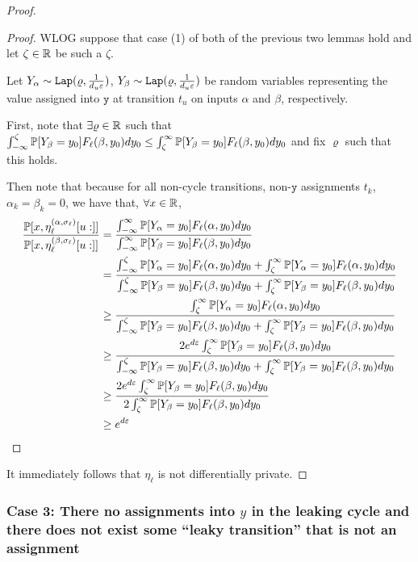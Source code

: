 \begin{proof}
\begin{proof}
	WLOG suppose that case (1) of both of the previous two lemmas hold and let $\zeta\in \mathbb{R}$ be such a $\zeta$. 

	Let $Y_\alpha\sim \texttt{Lap}(\varrho, \frac{1}{d_u\varepsilon})$, $Y_\beta\sim \texttt{Lap}(\varrho, \frac{1}{d_u\varepsilon})$ be random variables representing the value assigned into $\texttt{y}$ at transition $t_u$ on inputs $\alpha$ and $\beta$, respectively. 

	First, note that $\exists \varrho\in \mathbb{R}$ such that $\int_{-\infty}^\zeta\mathbb{P}[Y_\beta=y_0]F_\ell(\beta, y_0)dy_0\leq \int_{\zeta}^\infty\mathbb{P}[Y_\beta=y_0]F_\ell(\beta, y_0)dy_0$ and fix $\varrho$ such that this holds. 

	Then note that because for all non-cycle transitions, non-$\texttt{y}$ assignments $t_k$, $\alpha_k=\beta_k=0$, we have that, $\forall x\in \mathbb{R}$, \begin{align*}
		\frac{\mathbb{P}[x, \eta_\ell^{(\alpha, \sigma_\ell)}[u:]]}{\mathbb{P}[x, \eta_\ell^{(\beta, \sigma_\ell)}[u:]]}&=\frac{\int_{-\infty}^\infty\mathbb{P}[Y_\alpha=y_0]F_\ell(\alpha, y_0)dy_0}{\int_{-\infty}^\infty\mathbb{P}[Y_\beta=y_0]F_\ell(\beta, y_0)dy_0}\\
		&=\frac{\int_{-\infty}^\zeta\mathbb{P}[Y_\alpha=y_0]F_\ell(\alpha, y_0)dy_0+\int_{\zeta}^\infty\mathbb{P}[Y_\alpha=y_0]F_\ell(\alpha, y_0)dy_0}{\int_{-\infty}^\zeta\mathbb{P}[Y_\beta=y_0]F_\ell(\beta, y_0)dy_0+\int_{\zeta}^\infty\mathbb{P}[Y_\beta=y_0]F_\ell(\beta, y_0)dy_0}\\
		&\geq \frac{\int_{\zeta}^\infty\mathbb{P}[Y_\alpha=y_0]F_\ell(\alpha, y_0)dy_0}{\int_{-\infty}^\zeta\mathbb{P}[Y_\beta=y_0]F_\ell(\beta, y_0)dy_0+\int_{\zeta}^\infty\mathbb{P}[Y_\beta=y_0]F_\ell(\beta, y_0)dy_0}\\
		&\geq \frac{2e^{d\varepsilon}\int_{\zeta}^\infty\mathbb{P}[Y_\beta=y_0]F_\ell(\beta, y_0)dy_0}{\int_{-\infty}^\zeta\mathbb{P}[Y_\beta=y_0]F_\ell(\beta, y_0)dy_0+\int_{\zeta}^\infty\mathbb{P}[Y_\beta=y_0]F_\ell(\beta, y_0)dy_0}\\
		&\geq \frac{2e^{d\varepsilon}\int_{\zeta}^\infty\mathbb{P}[Y_\beta=y_0]F_\ell(\beta, y_0)dy_0}{2\int_{\zeta}^\infty\mathbb{P}[Y_\beta=y_0]F_\ell(\beta, y_0)dy_0}\\
		&\geq e^{d\varepsilon}
	\end{align*}
\end{proof}


It immediately follows that $\eta_\ell$ is not differentially private. 

\end{proof}

\subsubsection{Case 3: There no assignments into $y$ in the leaking cycle and there does not exist some ``leaky transition'' that is not an assignment}


